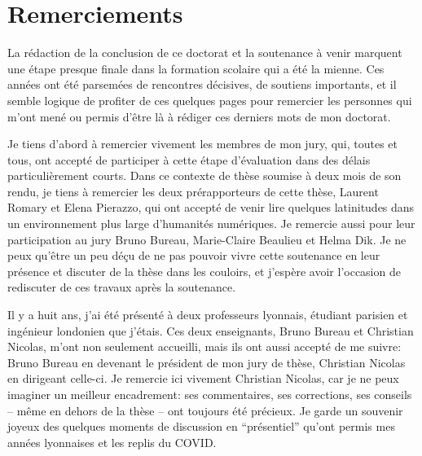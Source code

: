 \chapter*{Remerciements}

La rédaction de la conclusion de ce doctorat et la soutenance à venir marquent une étape presque finale dans la formation scolaire qui a été la mienne. Ces années ont été parsemées de rencontres décisives, de soutiens importants, et il semble logique de profiter de ces quelques pages pour remercier les personnes qui m'ont mené ou permis d'être là à rédiger ces derniers mots de mon doctorat. 

Je tiens d'abord à remercier vivement les membres de mon jury, qui, toutes et tous, ont accepté de participer à cette étape d'évaluation dans des délais particulièrement courts. Dans ce contexte de thèse soumise à deux mois de son rendu, je tiens à remercier les deux prérapporteurs de cette thèse, Laurent Romary et Elena Pierazzo, qui ont accepté de venir lire quelques latinitudes dans un environnement plus large d'humanités numériques. Je remercie aussi pour leur participation au jury Bruno Bureau, Marie-Claire Beaulieu et Helma Dik. Je ne peux qu'être un peu déçu de ne pas pouvoir vivre cette soutenance en leur présence et discuter de la thèse dans les couloirs, et j'espère avoir l'occasion de rediscuter de ces travaux après la soutenance.

Il y a huit ans, j'ai été présenté à deux professeurs lyonnais, étudiant parisien et ingénieur londonien que j'étais. Ces deux enseignants, Bruno Bureau et Christian Nicolas, m'ont non seulement accueilli, mais ils ont aussi accepté de me suivre: Bruno Bureau en devenant le président de mon jury de thèse, Christian Nicolas en dirigeant celle-ci. Je remercie ici vivement Christian Nicolas, car je ne peux imaginer un meilleur encadrement: ses commentaires, ses corrections, ses conseils -- même en dehors de la thèse -- ont toujours été précieux. Je garde un souvenir joyeux des quelques moments de discussion en \enquote{présentiel} qu'ont permis mes années lyonnaises et les replis du COVID. 

